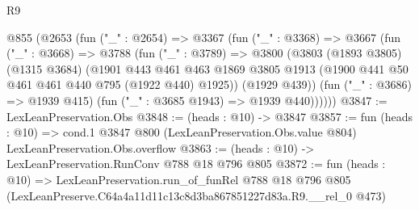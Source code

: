 \begin{lexlean}{R9}
\begin{coremodule}
  @855
    (@2653
      (fun ("_" : @2654) =>
      @3367
        (fun ("_" : @3368) =>
        @3667
          (fun ("_" : @3668) =>
          @3788
            (fun ("_" : @3789) =>
            @3800
              (@3803
                (@1893 @3805)
                (@1315 @3684)
                (@1901
                  @443
                  @461
                  @463
                  @1869
                  @3805
                  @1913
                  (@1900 @441 @50 @461 @461 @440 @795 (@1922 @440) @1925))
                (@1929 @439))
              (fun ("_" : @3686) => @1939 @415)
              (fun ("_" : @3685 @1943) => @1939 @440))))))
@3847 := LexLeanPreservation.Obs
@3848 := (heads : @10) -> @3847
@3857 := fun (heads : @10) =>
  cond.{1} @3847 @800 (LexLeanPreservation.Obs.value @804) LexLeanPreservation.Obs.overflow
@3863 := (heads : @10) -> LexLeanPreservation.RunConv @788 @18 @796 @805
@3872 := fun (heads : @10) =>
  LexLeanPreservation.run_of_funRel
    @788
    @18
    @796
    @805
    (LexLeanPreserve.C64a4a11d11c13c8d3ba867851227d83a.R9.__rel_0 @473)
\end{coremodule}
\end{lexlean}
